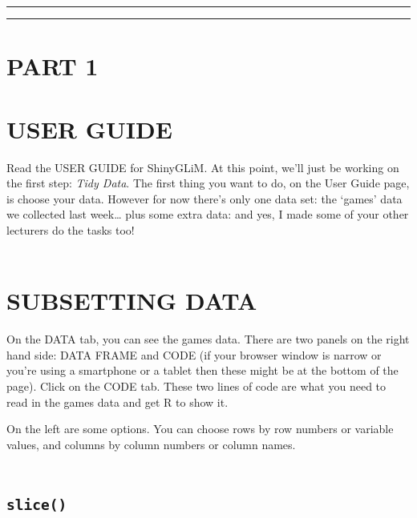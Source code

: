 \documentclass[
]{book}
\begin{document}
\begin{center}\rule{0.5\linewidth}{\linethickness}\end{center}

\begin{center}\rule{0.5\linewidth}{\linethickness}\end{center}

\hypertarget{part-1}{%
\section{PART 1}\label{part-1}}

\hypertarget{user-guide}{%
\section{USER GUIDE}\label{user-guide}}

Read the USER GUIDE for ShinyGLiM. At this point, we'll just be working on the
first step: \emph{Tidy Data}. The first thing you want to do, on the User Guide page,
is choose your data. However for now there's only one data set: the `games'
data we collected last week\ldots{} plus some extra data: and yes, I made some of your
other lecturers do the tasks too!\\
~\\

\hypertarget{subsetting-data}{%
\section{SUBSETTING DATA}\label{subsetting-data}}

On the DATA tab, you can see the games data. There are two panels on the right
hand side: DATA FRAME and CODE (if your browser window is narrow or you're
using a smartphone or a tablet then these might be at the bottom of the
page). Click on the CODE tab. These two lines of
code are what you need to read in the games data and get R to show it.

On the left are some options. You can choose rows by row numbers or variable
values, and columns by column numbers or column names.\\
~\\

\hypertarget{slice}{%
\subsection{\texorpdfstring{\texttt{slice()}}{slice()}}\label{slice}}
\end{document}
